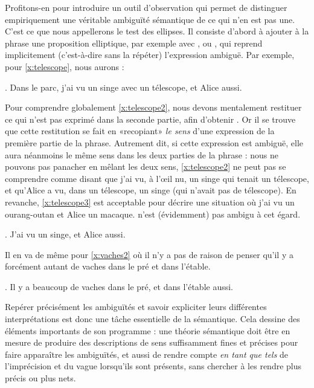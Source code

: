 \begin{refsegment}

Profitons-en pour introduire un outil d'observation qui permet de distinguer empiriquement une véritable ambiguïté sémantique de ce qui n'en est pas une.  C'est ce que nous appellerons le test des ellipses. Il consiste d'abord à ajouter à la phrase une proposition elliptique, par exemple avec ,  ou , qui reprend implicitement (c'est-à-dire sans la répéter) l'expression ambiguë.  Par exemple, pour \ref{x:telescope}, nous aurons :

\ex. 
Dans le parc, j'ai vu un singe avec un télescope, et Alice aussi. \label{x:telescope2}


Pour comprendre globalement \ref{x:telescope2}, nous devons mentalement restituer ce qui n'est pas exprimé dans la seconde partie, afin d'obtenir .  Or il se trouve que cette restitution se fait en «recopiant» \emph{le sens} d'une expression de la première partie de la phrase.\label{test:ellipse}
Autrement dit, si cette expression est ambiguë, elle aura néanmoins le même sens dans les deux parties de la phrase : nous ne pouvons pas panacher en mêlant les deux sens, \ref{x:telescope2}  ne peut pas se comprendre comme disant que j'ai vu, à l'\oe il nu, un singe qui tenait un télescope, et qu'Alice a vu, dans un télescope, un singe (qui n'avait pas de télescope). 
En revanche, \ref{x:telescope3} est acceptable pour décrire une situation où j'ai vu un ourang-outan et Alice un macaque.   n'est (évidemment) pas ambigu à cet égard. 

\ex. 
J'ai vu un singe, et Alice aussi. \label{x:telescope3}


Il en va de même pour \ref{x:vaches2} où il n'y a pas de raison de penser qu'il y a forcément autant de vaches dans le pré et dans l'étable.

\ex. \label{x:vaches2}
Il y a beaucoup de vaches dans le pré, et dans l'étable aussi.


Repérer précisément les ambiguïtés et savoir expliciter leurs différentes interprétations est donc une tâche essentielle de la sémantique.  
Cela dessine des éléments importants de son programme : une théorie sémantique doit être en mesure de produire des descriptions de sens suffisamment fines et précises pour faire apparaître les ambiguïtés, et aussi de rendre compte \emph{en tant que tels} de l'imprécision et du vague lorsqu'ils sont présents, sans chercher à les rendre plus précis ou plus nets.


\end{refsegment}
